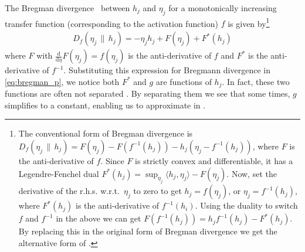 \documentclass[twoside]{article}
\theoremstyle{plain}
\theoremstyle{definition}
\theoremstyle{remark}
\newcommand{\eg}[0]{\emph{e.g.},~}
\newcommand{\wrt}{w.r.t.~}
\newcommand{\refEq}[1]{\cref{#1}}%
\newcommand{\boldit}[1]{\ensuremath{#1}}
\newcommand{\sfit}[1]{\ensuremath{#1}}
\newcommand{\y}[0]{\ensuremath{{h}}}%
\newcommand{\ff}[0]{\ensuremath{\sfit{f}}}%
\newcommand{\ffinv}[0]{\ensuremath{\sfit{f}^{-1}}}%
\newcommand{\FF}[0]{\ensuremath{\sfit{F}}}%
\newcommand{\DD}[0]{\ensuremath{\boldit{\sfit{D}}}}%
\newcommand{\gh}[0]{\ensuremath{\sfit{g}}}%
\newcommand{\dd}[0]{\ensuremath{\mathrm{d}}}%
\begin{document}
The Bregman divergence~\citep{bregman1967relaxation,banerjee2005clustering} between $\y_j$
and $\eta_j$ for a monotonically increasing transfer function (corresponding to the activation function) $\ff$ is given by\footnote{
The conventional form of Bregman divergence is
   $\DD_{\ff}(\eta_j\, \|\,\y_j ) = \FF(\eta_j) - \FF(\ffinv(\y_j)) - \y_j (\eta_j - \ffinv(\y_j))$,
where $\FF$ is the anti-derivative of $\ff$.
Since $\FF$ is strictly convex and differentiable, it has a Legendre-Fenchel dual
$\FF^*(\y_j) = \sup_{\eta_j} \langle \y_j, \eta_j\rangle - \FF(\eta_j)$.
 Now, set the derivative of the r.h.s.  \wrt $\eta_j$ to zero to get $\y_j = \ff(\eta_j)$, or $\eta_j = \ffinv(\y_j)$, where $\FF^*(\y_j)$ is the anti-derivative of $\ffinv(\y_i)$. 
Using the duality to switch $\ff$ and $\ffinv$ in the above we can get $\FF(\ffinv(\y_j)) = \y_j \ffinv(\y_j) - \FF^*(\y_j)$. By replacing this in the original form of Bregman divergence we get the alternative form of .}
\begin{align}
  \label{eq:bregman}
  \DD_{\ff}(\eta_j\, \|\, \y_j) = - \eta_j \y_j + \FF(\eta_j) + \FF^*(\y_j)
\end{align}
where $\FF$ with $\frac{\dd}{\dd \eta} \FF(\eta_j) =  \ff(\eta_j)$ is the anti-derivative of $\ff$
and $\FF^*$ is the anti-derivative of $\ffinv$. Substituting this expression for Bregmann divergence in
\refEq{eq:bregman_p}, we notice both $\FF^*$ and $\gh$ are functions of $\y_j$. 
In fact, these two functions are often not separated \citep[\eg][]{mccullagh1989generalized}. By separating them
we see that some times, $\gh$ simplifies to a constant, enabling us to approximate  in .
\end{document}
